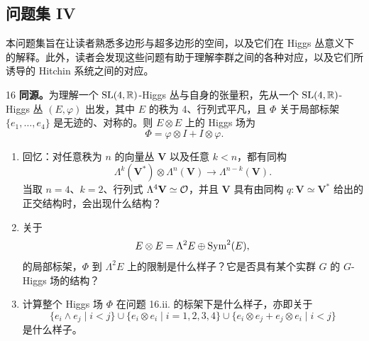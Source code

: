 
\subsection{问题集 IV}

本问题集旨在让读者熟悉多边形与超多边形的空间，以及它们在 Higgs 丛意义下的解释。此外，读者会发现这些问题有助于理解李群之间的各种对应，以及它们所诱导的 Hitchin 系统之间的对应。

\begin{prob}{16} \textbf{同源。}为理解一个 $\mathrm{SL}(4,\mathbb{R})$-Higgs 丛与自身的张量积，先从一个 $\mathrm{SL}(4,\mathbb{R})$-Higgs 丛 $(E,\varphi)$ 出发，其中 $E$ 的秩为 4、行列式平凡，且 $\Phi$ 关于局部标架 $\{e_1,\dots,e_4\}$ 是无迹的、对称的。则 $E\otimes E$ 上的 Higgs 场为
\[
\Phi = \varphi\otimes I + I\otimes\varphi.
\]
\begin{enumerate}[label=(\roman*),leftmargin=2.2em]
\item 回忆：对任意秩为 $n$ 的向量丛 $\mathbf{V}$ 以及任意 $k<n$，都有同构
\[
\Lambda^{k}(\mathbf{V}^{*})\otimes\Lambda^{n}(\mathbf{V})\longrightarrow\Lambda^{n-k}(\mathbf{V}).
\]
当取 $n=4$、$k=2$、行列式 $\Lambda^{4}\mathbf{V}\simeq\mathcal{O}$，并且 $\mathbf{V}$ 具有由同构 $q:\mathbf{V}\simeq \mathbf{V}^{*}$ 给出的正交结构时，会出现什么结构？
\item 关于
\[
E\otimes E = \Lambda^{2}E\oplus\operatorname{Sym}^{2}(E),
\]
的局部标架，$\Phi$ 到 $\Lambda^{2}E$ 上的限制是什么样子？它是否具有某个实群 $G$ 的 $G$-Higgs 场的结构？
\item 计算整个 Higgs 场 $\Phi$ 在问题 16.ii. 的标架下是什么样子，亦即关于
\[
\{e_i\wedge e_j\mid i<j\}\cup\{e_i\otimes e_i\mid i=1,2,3,4\}\cup\{e_i\otimes e_j+e_j\otimes e_i\mid i<j\}
\]
是什么样子。
\end{enumerate}
\end{prob}

